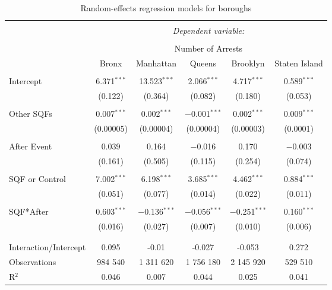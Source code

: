 
\begin{table}[!htbp] \centering 
  \caption{Random-effects regression models for boroughs} 
  \label{} 
\footnotesize 
\begin{tabular}{@{\extracolsep{1pt}}lccccc} 
\\[-1.8ex]\hline 
\hline \\[-1.8ex] 
 & \multicolumn{5}{c}{\textit{Dependent variable:}} \\ 
\cline{2-6} 
\\[-1.8ex] & \multicolumn{5}{c}{Number of Arrests \vspace*{0.2cm}} \\ 
 & Bronx & Manhattan & Queens & Brooklyn & Staten Island \\ 
\hline \\[-1.8ex] 
 Intercept & 6.371$^{***}$ & 13.523$^{***}$ & 2.066$^{***}$ & 4.717$^{***}$ & 0.589$^{***}$ \\ 
  & (0.122) & (0.364) & (0.082) & (0.180) & (0.053) \\ 
  & & & & & \\ 
 Other SQFs & 0.007$^{***}$ & 0.002$^{***}$ & $-$0.001$^{***}$ & 0.002$^{***}$ & 0.009$^{***}$ \\ 
  & (0.00005) & (0.00004) & (0.00004) & (0.00003) & (0.0001) \\ 
  & & & & & \\ 
 After Event & 0.039 & 0.164 & $-$0.016 & 0.170 & $-$0.003 \\ 
  & (0.161) & (0.505) & (0.115) & (0.254) & (0.074) \\ 
  & & & & & \\ 
 SQF or Control & 7.002$^{***}$ & 6.198$^{***}$ & 3.685$^{***}$ & 4.462$^{***}$ & 0.884$^{***}$ \\ 
  & (0.051) & (0.077) & (0.014) & (0.022) & (0.011) \\ 
  & & & & & \\ 
 SQF*After & 0.603$^{***}$ & $-$0.136$^{***}$ & $-$0.056$^{***}$ & $-$0.251$^{***}$ & 0.160$^{***}$ \\ 
  & (0.016) & (0.027) & (0.007) & (0.010) & (0.006) \\ 
  & & & & & \\ 
\hline \\[-1.8ex] 
Interaction/Intercept & 0.095 & -0.01 & -0.027 & -0.053 & 0.272 \\ 
Observations & 984 540 & 1 311 620 & 1 756 180 & 2 145 920 & 529 510 \\ 
R$^{2}$ & 0.046 & 0.007 & 0.044 & 0.025 & 0.041 \\ 

\end{tabular}
\end{table}
